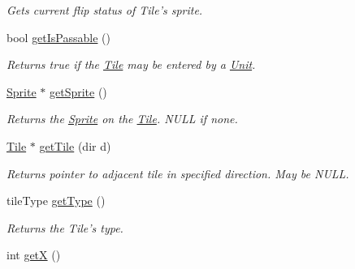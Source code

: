 \begin{DoxyCompactItemize}
\begin{DoxyCompactList}\small\item\em Gets current flip status of Tile’s sprite. \end{DoxyCompactList}\item 
bool \hyperlink{class_tile_aaddc2d065a537489c31de4a566bb0bd5}{get\+Is\+Passable} ()\hypertarget{class_tile_aaddc2d065a537489c31de4a566bb0bd5}{}\label{class_tile_aaddc2d065a537489c31de4a566bb0bd5}

\begin{DoxyCompactList}\small\item\em Returns true if the \hyperlink{class_tile}{Tile} may be entered by a \hyperlink{class_unit}{Unit}. \end{DoxyCompactList}\item 
\hyperlink{class_sprite}{Sprite} $\ast$ \hyperlink{class_tile_a42f98bf8592783e96f42d6889a8d7e4f}{get\+Sprite} ()\hypertarget{class_tile_a42f98bf8592783e96f42d6889a8d7e4f}{}\label{class_tile_a42f98bf8592783e96f42d6889a8d7e4f}

\begin{DoxyCompactList}\small\item\em Returns the \hyperlink{class_sprite}{Sprite} on the \hyperlink{class_tile}{Tile}. N\+U\+LL if none. \end{DoxyCompactList}\item 
\hyperlink{class_tile}{Tile} $\ast$ \hyperlink{class_tile_ae5038e62f2a4c28150f6abb4deb31433}{get\+Tile} (dir d)\hypertarget{class_tile_ae5038e62f2a4c28150f6abb4deb31433}{}\label{class_tile_ae5038e62f2a4c28150f6abb4deb31433}

\begin{DoxyCompactList}\small\item\em Returns pointer to adjacent tile in specified direction. May be N\+U\+LL. \end{DoxyCompactList}\item 
tile\+Type \hyperlink{class_tile_a36871de25627c7483c31807da1c28706}{get\+Type} ()\hypertarget{class_tile_a36871de25627c7483c31807da1c28706}{}\label{class_tile_a36871de25627c7483c31807da1c28706}

\begin{DoxyCompactList}\small\item\em Returns the Tile’s type. \end{DoxyCompactList}\item 
int \hyperlink{class_tile_a25b90e07fd9cdaba1df3ac2a9b6d032b}{getX} ()\hypertarget{class_tile_a25b90e07fd9cdaba1df3ac2a9b6d032b}{}\label{class_tile_a25b90e07fd9cdaba1df3ac2a9b6d032b}


\end{DoxyCompactItemize}
